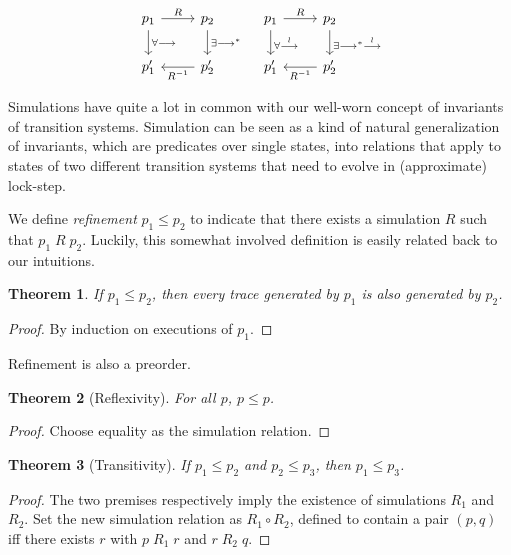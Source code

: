 \documentclass{amsbook}
\newtheorem{theorem}{Theorem}[chapter]
\theoremstyle{definition}
\theoremstyle{remark}
\numberwithin{section}{chapter}
\numberwithin{equation}{chapter}
\begin{document}
\[
\begin{tikzcd}
p_1 \arrow{r}{R} \arrow{d}{\forall \longrightarrow} & p_2 \arrow{d}{\exists \longrightarrow^*} \\
p'_1 & p'_2 \arrow{l}{R^{-1}}
\end{tikzcd}
\quad \begin{tikzcd}
p_1 \arrow{r}{R} \arrow{d}{\forall \stackrel{l}{\longrightarrow}} & p_2 \arrow{d}{\exists \longrightarrow^* \stackrel{l}{\longrightarrow}} \\
p'_1 & p'_2 \arrow{l}{R^{-1}}
\end{tikzcd}
\]

\newcommand{\refines}[2]{#1 \leq #2}

\invariants
Simulations have quite a lot in common with our well-worn concept of invariants of transition systems.
Simulation can be seen as a kind of natural generalization of invariants, which are predicates over single states, into relations that apply to states of two different transition systems that need to evolve in (approximate) lock-step.

We define \emph{refinement} $\refines{p_1}{p_2}$ to indicate that there exists a simulation $R$ such that $p_1 \; R \; p_2$.
Luckily, this somewhat involved definition is easily related back to our intuitions.

\begin{theorem}
  If $\refines{p_1}{p_2}$, then every trace generated by $p_1$ is also generated by $p_2$.
\end{theorem}
\begin{proof}
  By induction on executions of $p_1$.
\end{proof}

Refinement is also a preorder.

\begin{theorem}[Reflexivity]
  For all $p$, $\refines{p}{p}$.
\end{theorem}
\begin{proof}
  Choose equality as the simulation relation.
\end{proof}

\begin{theorem}[Transitivity]
  If $\refines{p_1}{p_2}$ and $\refines{p_2}{p_3}$, then $\refines{p_1}{p_3}$.
\end{theorem}
\begin{proof}
  The two premises respectively imply the existence of simulations $R_1$ and $R_2$.
  Set the new simulation relation as $R_1 \circ R_2$, defined to contain a pair $(p, q)$ iff there exists $r$ with $p \; R_1 \; r$ and $r \; R_2 \; q$.
\end{proof}
\end{document}
